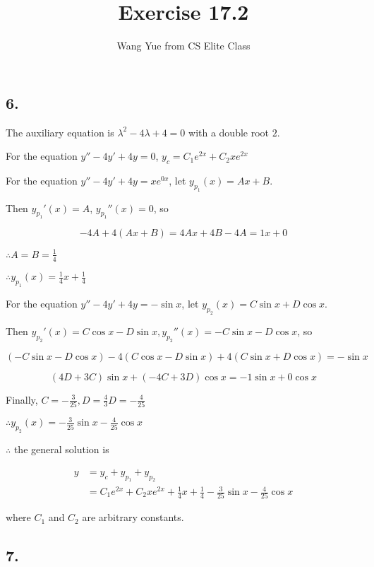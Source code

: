 \documentclass{article}
\begin{document}
  \title{Exercise 17.2}
  \author{Wang Yue from CS Elite Class}
  \maketitle

  \subsection*{6. }
  
  The auxiliary equation is $\lambda^2 - 4\lambda + 4 = 0$ with a double root $2$.

  For the equation $y'' - 4y' + 4y = 0$, $y_c = C_1 e^{2x} + C_2 x e^{2x}$

  For the equation $y'' - 4y' + 4y = xe^{0x}$, let $y_{p_1}(x) = Ax + B$.

  Then $y_{p_1}'(x) = A$, $y_{p_1}''(x) = 0$, so

  $$-4A + 4(Ax + B) = 4Ax + 4B - 4A =  1x + 0$$

  $\therefore A = B = \frac 1 4$

  $\therefore y_{p_1}(x) = \frac 1 4 x + \frac 1 4$

  For the equation $y'' - 4y' + 4y = -\sin x$, let $y_{p_2}(x) = C \sin x + D \cos x$.

  Then $y_{p_2}'(x) = C \cos x - D \sin x, y_{p_2}''(x) = -C \sin x - D \cos x$, so

  $$(-C\sin x - D \cos x) - 4(C \cos x - D \sin x) + 4(C \sin x + D \cos x) = -\sin x$$

  $$(4D+3C) \sin x + (-4C+3D) \cos x = -1\sin x + 0\cos x$$

  Finally, $C = -\frac{3}{25}, D = \frac 4 3 D = -\frac{4}{25}$

  $\therefore y_{p_2}(x) = -\frac{3}{25} \sin x - \frac{4}{25} \cos x$

  $\therefore$ the general solution is

  $$\begin{aligned}
    y &= y_c + y_{p_1} + y_{p_2} \\
      &= C_1 e^{2x} + C_2 xe^{2x} + \frac 1 4 x + \frac 1 4 - \frac{3}{25} \sin x - \frac{4}{25} \cos x
  \end{aligned}$$

  where $C_1$ and $C_2$ are arbitrary constants.

  \subsection*{7. }
\end{document}
